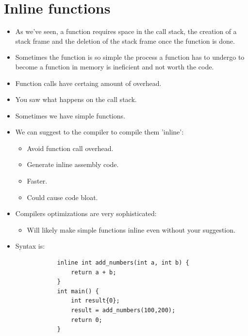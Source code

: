 \section{Inline functions}
\begin{itemize}
    \item As we've seen, a function requires space in the call stack, the creation of a stack frame and the deletion of the stack frame once the function is done.
    \item Sometimes the function is so simple the process a function has to undergo to become a function in memory is ineficient and not worth the code.
    \item Function calls have certaing amount of overhead.
    \item You saw what happens on the call stack.
    \item Sometimes we have simple functions.
    \item We can suggest to the compiler to compile them 'inline':
        \begin{itemize}
            \item Avoid function call overhead.
            \item Generate inline assembly code.
            \item Faster.
            \item Could cause code bloat.
        \end{itemize}
    
    \item Compilers optimizations are very sophisticated:
        \begin{itemize}
            \item Will likely make simple functions inline even without your suggestion.
        \end{itemize}
    
    \item Syntax is:
        \begin{verbatim}
            inline int add_numbers(int a, int b) {
                return a + b;
            }
            int main() {
                int result{0};
                result = add_numbers(100,200);
                return 0;
            }
        \end{verbatim}
\end{itemize}


